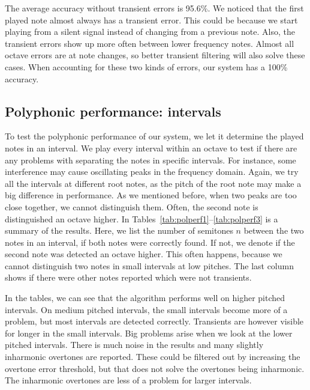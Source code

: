 \documentclass[10pt,twocolumn]{article}
\begin{document}
The average accuracy without transient errors is 95.6\%. We noticed that the first played note almost always has a transient error. This could be because we start playing from a silent signal instead of changing from a previous note. Also, the transient errors show up more often between lower frequency notes. Almost all octave errors are at note changes, so better transient filtering will also solve these cases. When accounting for these two kinds of errors, our system has a 100\% accuracy.

\subsection{Polyphonic performance: intervals}
To test the polyphonic performance of our system, we let it determine the played notes in an interval. We play every interval within an octave to test if there are any problems with separating the notes in specific intervals. For instance, some interference may cause oscillating peaks in the frequency domain. Again, we try all the intervals at different root notes, as the pitch of the root note may make a big difference in performance. As we mentioned before, when two peaks are too close together, we cannot distinguish them. Often, the second note is distinguished an octave higher. In Tables~\ref{tab:polperf1}--\ref{tab:polperf3} is a summary of the results. Here, we list the number of semitones $n$ between the two notes in an interval, if both notes were correctly found. If not, we denote if the second note was detected an octave higher. This often happens, because we cannot distinguish two notes in small intervals at low pitches. The last column shows if there were other notes reported which were not transients.

In the tables, we can see that the algorithm performs well on higher pitched intervals. On medium pitched intervals, the small intervals become more of a problem, but most intervals are detected correctly. Transients are however visible for longer in the small intervals. Big problems arise when we look at the lower pitched intervals. There is much noise in the results and many slightly inharmonic overtones are reported. These could be filtered out by increasing the overtone error threshold, but that does not solve the overtones being inharmonic. The inharmonic overtones are less of a problem for larger intervals.
%
%
\end{document}
